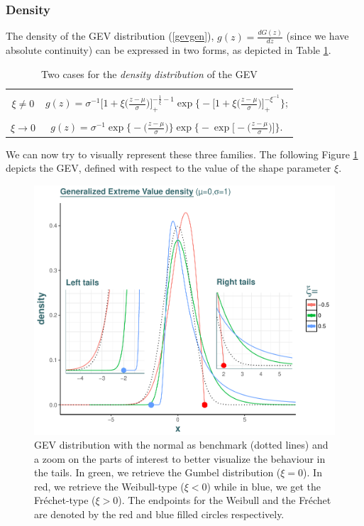 \subsubsection*{Density} 
The density of the GEV distribution (\ref{gevgen}), $g(z)=\frac{d G(z)}{dz}$ (since we have absolute continuity) can be expressed in two forms, as depicted in Table \ref{tab:gevdens}.

\begin{table}[!htb]
\centering\caption{Two cases for the \emph{density distribution} of the GEV}\label{tab:gevdens}
\begin{tabular}{|c|c|}
\hline \\
$\xi\neq 0$ &  $g(z)=\sigma^{-1}\bigg[1+\xi\bigg(\frac{z-\mu}{\sigma}\bigg)\bigg]_+^{-\frac{1}{\xi}-1}\exp\Bigg\{-\bigg[1+\xi\bigg(\frac{z-\mu}{\sigma}\bigg)\bigg]_+^{-\xi^{-1}}\Bigg\}$; \\
 \hline  \\
$\xi\to 0$ & $g(z)= \sigma^{-1}\exp\bigg\{-\bigg(\frac{z-\mu}{\sigma}\bigg)\bigg\}\exp\Bigg\{-\exp\bigg[-\bigg(\frac{z-\mu}{\sigma}\bigg)\bigg]\Bigg\}$. \\ 
\hline 
\end{tabular}
\end{table}

We can now try to visually represent these three families. The following Figure \ref{gevdens} depicts the GEV, defined with respect to the value of the shape parameter $\xi$. 

\begin{figure}[!htb]
	\centering\includegraphics[width=0.8\linewidth]{gev3.pdf}\caption{GEV distribution with the normal as benchmark (dotted lines) and a zoom on the parts of interest to better visualize the behaviour in the tails. In green, we retrieve the Gumbel distribution ($\xi=0$). In red, we retrieve the Weibull-type ($\xi<0$) while in blue, we get the Fréchet-type ($\xi>0$). The endpoints for the Weibull and the Fréchet are denoted by the red and blue filled circles respectively. }\label{gevdens}
\end{figure}


